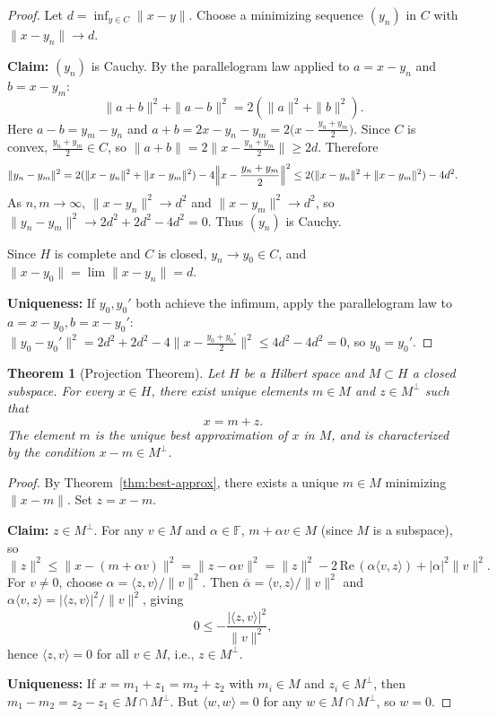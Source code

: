 \documentclass[11pt,a4paper]{article}
\theoremstyle{definition}
\theoremstyle{plain}
\newtheorem{theorem}{Theorem}[section]
\theoremstyle{remark}
\begin{document}
\begin{proof}
Let $d = \inf_{y \in C} \|x - y\|$. Choose a minimizing sequence
$(y_n)$ in $C$ with $\|x - y_n\| \to d$.

\textbf{Claim:} $(y_n)$ is Cauchy. By the parallelogram law applied to
$a = x - y_n$ and $b = x - y_m$:
\[
    \|a + b\|^2 + \|a - b\|^2 = 2(\|a\|^2 + \|b\|^2).
\]
Here $a - b = y_m - y_n$ and
$a + b = 2x - y_n - y_m = 2\bigl(x - \frac{y_n + y_m}{2}\bigr)$.
Since $C$ is convex, $\frac{y_n + y_m}{2} \in C$, so
$\|a + b\| = 2\bigl\|x - \frac{y_n + y_m}{2}\bigr\| \geq 2d$.
Therefore
\[
    \|y_n - y_m\|^2
    = 2(\|x - y_n\|^2 + \|x - y_m\|^2) - 4\Bigl\|x - \frac{y_n + y_m}{2}\Bigr\|^2
    \leq 2(\|x - y_n\|^2 + \|x - y_m\|^2) - 4d^2.
\]
As $n, m \to \infty$, $\|x - y_n\|^2 \to d^2$ and $\|x - y_m\|^2 \to d^2$,
so $\|y_n - y_m\|^2 \to 2d^2 + 2d^2 - 4d^2 = 0$. Thus $(y_n)$ is Cauchy.

Since $H$ is complete and $C$ is closed, $y_n \to y_0 \in C$, and
$\|x - y_0\| = \lim \|x - y_n\| = d$.

\textbf{Uniqueness:} If $y_0, y_0'$ both achieve the infimum, apply the
parallelogram law to $a = x - y_0, b = x - y_0'$:
$\|y_0 - y_0'\|^2 = 2d^2 + 2d^2 - 4\|x - \frac{y_0 + y_0'}{2}\|^2
\leq 4d^2 - 4d^2 = 0$, so $y_0 = y_0'$.
\end{proof}

\begin{theorem}[Projection Theorem]\label{thm:projection}
Let $H$ be a Hilbert space and $M \subset H$ a closed subspace. For every
$x \in H$, there exist unique elements $m \in M$ and $z \in M^\perp$ such that
\[
    x = m + z.
\]
The element $m$ is the unique best approximation of $x$ in $M$, and is
characterized by the condition $x - m \in M^\perp$.
\end{theorem}

\begin{proof}
By Theorem~\ref{thm:best-approx}, there exists a unique $m \in M$ minimizing
$\|x - m\|$. Set $z = x - m$.

\textbf{Claim:} $z \in M^\perp$. For any $v \in M$ and $\alpha \in \mathbb{F}$,
$m + \alpha v \in M$ (since $M$ is a subspace), so
\[
    \|z\|^2 \leq \|x - (m + \alpha v)\|^2 = \|z - \alpha v\|^2
    = \|z\|^2 - 2\,\mathrm{Re}\,(\alpha \langle v, z \rangle)
      + |\alpha|^2 \|v\|^2.
\]
For $v \neq 0$, choose $\alpha = \langle z, v \rangle / \|v\|^2$.
Then $\overline{\alpha} = \langle v, z \rangle / \|v\|^2$ and
$\alpha \langle v, z \rangle = |\langle z, v \rangle|^2 / \|v\|^2$, giving
\[
    0 \leq -\frac{|\langle z, v \rangle|^2}{\|v\|^2},
\]
hence $\langle z, v \rangle = 0$ for all $v \in M$, i.e., $z \in M^\perp$.

\textbf{Uniqueness:} If $x = m_1 + z_1 = m_2 + z_2$ with $m_i \in M$ and
$z_i \in M^\perp$, then $m_1 - m_2 = z_2 - z_1 \in M \cap M^\perp$.
But $\langle w, w \rangle = 0$ for any $w \in M \cap M^\perp$, so $w = 0$.
\end{proof}
\end{document}
